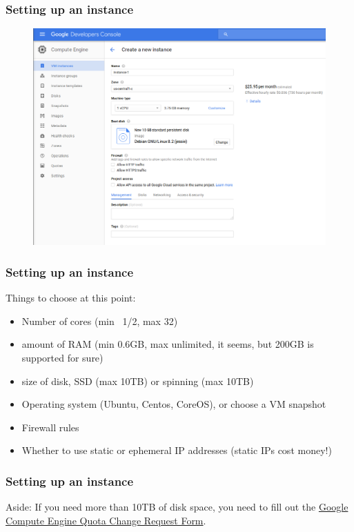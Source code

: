 \documentclass[9pt]{beamer}
\begin{document}
\begin{frame}[fragile]
  \frametitle{Setting up an instance}
  \begin{figure}
    \includegraphics[scale=0.3]{figures/CreateInstance.png}
  \end{figure}
\end{frame}

\begin{frame}[fragile]
  \frametitle{Setting up an instance}
  Things to choose at this point:
  \pause
  \begin{itemize}
  \item Number of cores (min ~1/2, max 32)
    \pause
  \item amount of RAM (min 0.6GB, max unlimited, it seems, but 200GB is supported for sure)
    \pause
  \item size of disk, SSD (max 10TB) or spinning (max 10TB) 
    \pause
  \item Operating system (Ubuntu, Centos, CoreOS), or choose a VM snapshot
    \pause
  \item Firewall rules
    \pause
  \item Whether to use static or ephemeral IP addresses (static IPs cost money!)
  \end{itemize}
\end{frame}

\begin{frame}[fragile]
  \frametitle{Setting up an instance}
  Aside: If you need more than 10TB of disk space, you need to fill out the \href{https://docs.google.com/a/google.com/forms/d/1vb2MkAr9JcHrp6myQ3oTxCyBv2c7Iyc5wqIKqE3K4IE/viewform}{Google Compute Engine Quota Change Request Form}.
\end{frame}
\end{document}
